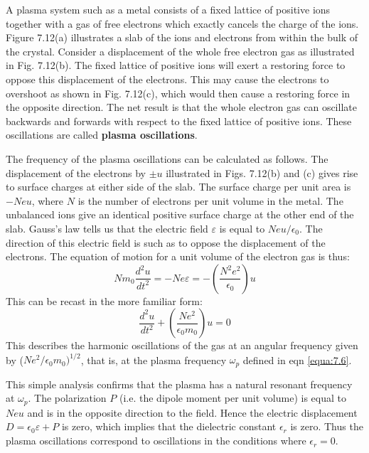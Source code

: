 \documentclass[12pt]{book}
\begin{document}
{A plasma system such as a metal consists of a fixed lattice of positive ions together with a gas of free electrons which exactly cancels the charge of the ions. Figure 7.12(a) illustrates a slab of the ions and electrons from within the bulk of the crystal. Consider a displacement of the whole free electron gas as illustrated in Fig. 7.12(b). The fixed lattice of positive ions will exert a restoring force to oppose this displacement of the electrons. This may cause the electrons to overshoot as shown in Fig. 7.12(c), which would then cause a restoring force in the opposite direction. The net result is that the whole electron gas can oscillate backwards and forwards with respect to the fixed lattice of positive ions. These oscillations are called \textbf{plasma oscillations}.

The frequency of the plasma oscillations can be calculated as follows. The displacement of the electrons by $\pm u$ illustrated in Figs. 7.12(b) and (c) gives rise to surface charges at either side of the slab. The surface charge per unit area is $-Neu$, where $N$ is the number of electrons per unit volume in the metal. The unbalanced ions give an identical positive surface charge at the other end of the slab. Gauss's law tells us that the electric field $\varepsilon$ is equal to $Neu/\epsilon_0$. The direction of this electric field is such as to oppose the displacement of the  electrons. The equation of motion for a unit volume of the electron gas is thus:
\begin{equation}\label{equa:7.31}
  Nm_0\frac{d^2u}{dt^2}=-Ne\varepsilon=-\left(\frac{N^2e^2}{\epsilon_0}\right)u
\end{equation}
This can be recast in the more familiar form:
\begin{equation}\label{equa:7.32}
  \frac{d^2u}{dt^2}+\left(\frac{Ne^2}{\epsilon_0m_0}\right)u=0
\end{equation}
This describes the harmonic oscillations of the gas at an angular frequency given by ($Ne^2/\epsilon_0m_0)^{1/2}$, that is, at the plasma frequency $\omega_p$ defined in eqn \ref{equa:7.6}.

This simple analysis confirms that the plasma has a natural resonant frequency at $\omega_p$. The polarization $P$ (i.e. the dipole moment per unit volume) is equal to $Neu$ and is in the opposite direction to the field. Hence the electric displacement $D = \epsilon_0\varepsilon + P$ is zero, which implies that the dielectric constant $\epsilon_r$ is zero. Thus the plasma oscillations correspond to oscillations in the conditions where $\epsilon_r= 0$.

}
\end{document}
